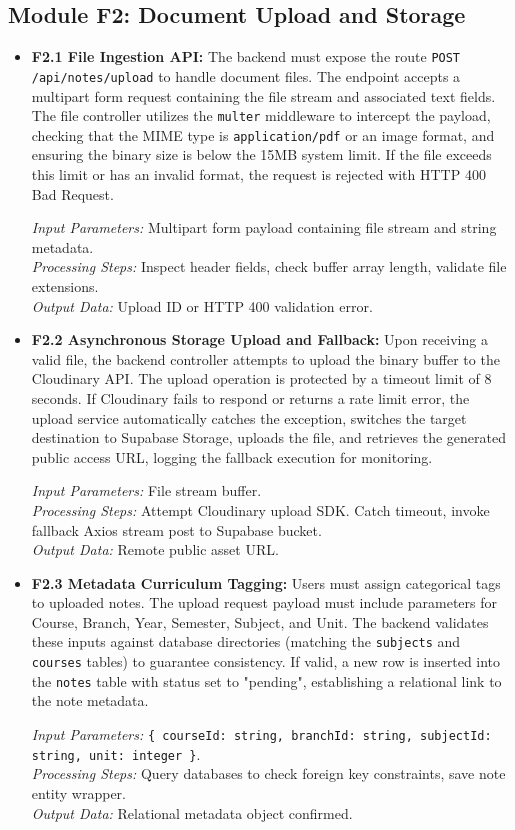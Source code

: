\documentclass[12,Times new Roman,a4paper]{report}
\begin{document}
\subsection{Module F2: Document Upload and Storage}
\begin{itemize}
    \item \textbf{F2.1 File Ingestion API:} The backend must expose the route \texttt{POST /api/notes/upload} to handle document files. The endpoint accepts a multipart form request containing the file stream and associated text fields. The file controller utilizes the \texttt{multer} middleware to intercept the payload, checking that the MIME type is \texttt{application/pdf} or an image format, and ensuring the binary size is below the 15MB system limit. If the file exceeds this limit or has an invalid format, the request is rejected with HTTP 400 Bad Request.
    
    \textit{Input Parameters:} Multipart form payload containing file stream and string metadata. \\
    \textit{Processing Steps:} Inspect header fields, check buffer array length, validate file extensions. \\
    \textit{Output Data:} Upload ID or HTTP 400 validation error.
    
    \item \textbf{F2.2 Asynchronous Storage Upload and Fallback:} Upon receiving a valid file, the backend controller attempts to upload the binary buffer to the Cloudinary API. The upload operation is protected by a timeout limit of 8 seconds. If Cloudinary fails to respond or returns a rate limit error, the upload service automatically catches the exception, switches the target destination to Supabase Storage, uploads the file, and retrieves the generated public access URL, logging the fallback execution for monitoring.
    
    \textit{Input Parameters:} File stream buffer. \\
    \textit{Processing Steps:} Attempt Cloudinary upload SDK. Catch timeout, invoke fallback Axios stream post to Supabase bucket. \\
    \textit{Output Data:} Remote public asset URL.
    
    \item \textbf{F2.3 Metadata Curriculum Tagging:} Users must assign categorical tags to uploaded notes. The upload request payload must include parameters for Course, Branch, Year, Semester, Subject, and Unit. The backend validates these inputs against database directories (matching the \texttt{subjects} and \texttt{courses} tables) to guarantee consistency. If valid, a new row is inserted into the \texttt{notes} table with status set to "pending", establishing a relational link to the note metadata.
    
    \textit{Input Parameters:} \texttt{\{ courseId: string, branchId: string, subjectId: string, unit: integer \}}. \\
    \textit{Processing Steps:} Query databases to check foreign key constraints, save note entity wrapper. \\
    \textit{Output Data:} Relational metadata object confirmed.
\end{itemize}
\end{document}
